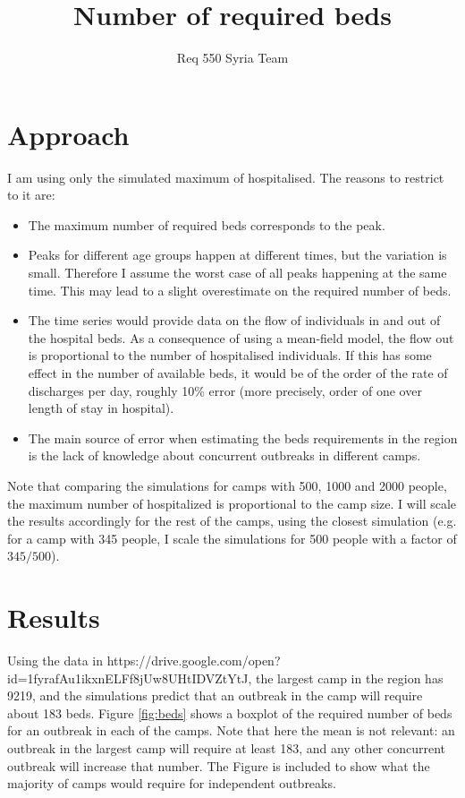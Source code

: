 \documentclass{article}
\title{Number of required beds}
\author{Req 550 Syria Team}
\begin{document}
\maketitle 

\section{Approach}

I am using only the simulated maximum of hospitalised. The reasons to restrict
to it are:
\begin{itemize}
    \item The maximum number of required beds corresponds to the peak.
    \item Peaks for different age groups happen at different times, but the
variation is small. Therefore I assume the worst case of all peaks happening at
the same time. This may lead to a slight overestimate on the required number of
beds.
    \item The time series would provide data on the flow of individuals in and
out of the hospital beds. As a consequence of using a mean-field model, the
flow out is proportional to the number of hospitalised individuals. If this has
some effect in the number of available beds, it would be of the order of the
rate of discharges per day, roughly 10\% error (more precisely, order of one
over length of stay in hospital).
    \item The main source of error when estimating the beds requirements in the
region is the lack of knowledge about concurrent outbreaks in different camps.
\end{itemize}
Note that comparing the simulations for camps with 500, 1000 and 2000 people,
the maximum number of hospitalized is proportional to the camp size. I will
scale the results accordingly for the rest of the camps, using the closest
simulation (e.g. for a camp with 345 people, I scale the simulations for 500
people with a factor of $345/500$).

\section{Results}
Using the data in
https://drive.google.com/open?id=1fyrafAu1ikxnELFf8jUw8UHtIDVZtYtJ, the largest
camp in the region has 9219, and the simulations predict that an outbreak in
the camp will require about 183 beds. Figure \ref{fig:beds} shows a boxplot of
the required number of beds for an outbreak in each of the camps. Note that
here the mean is not relevant: an outbreak in the largest camp will require at
least 183, and any other concurrent outbreak will increase that number. The
Figure is included to show what the majority of camps would require for
independent outbreaks.
\end{document}
